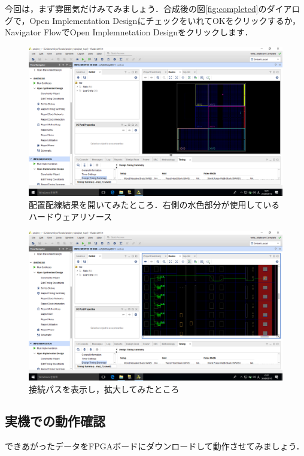 \documentclass[a4paper,dvipdfmx]{jsarticle}
\begin{document}
今回は，まず雰囲気だけみてみましょう．合成後の図\ref{fig:completed}のダイアログで，Open Implementation DesignにチェックをいれてOKをクリックするか，Navigator FlowでOpen Implemnetation Designをクリックします．

 \begin{figure}[H]
  \begin{center}
   \includegraphics[width=.8\textwidth]{chapter03_figures/VirtualBox_Windows10_19_03_2018_00_21_16.png}
  \end{center}
  \caption{配置配線結果を開いてみたところ．右側の水色部分が使用しているハードウェアリソース}
 \end{figure}

 \begin{figure}[H]
  \begin{center}
   \includegraphics[width=.8\textwidth]{chapter03_figures/VirtualBox_Windows10_19_03_2018_00_22_24.png}
  \end{center}
  \caption{接続パスを表示し，拡大してみたところ}
 \end{figure}


\subsection{実機での動作確認}

できあがったデータをFPGAボードにダウンロードして動作させてみましょう．
\end{document}
